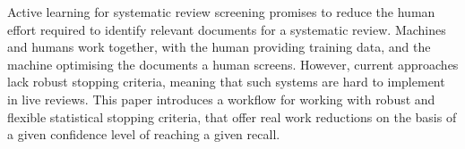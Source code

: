 \documentclass{article}
\begin{document}
Active learning for systematic review screening promises to reduce the human effort required to identify relevant documents for a systematic review. Machines and humans  work together, with the human providing training data, and the machine optimising the documents a human screens. However, current approaches lack robust stopping criteria, meaning that such systems are hard to implement in live reviews. This paper introduces a workflow for working with robust and flexible statistical stopping criteria, that offer real work reductions on the basis of a given confidence level of reaching a given recall.
\end{document}
